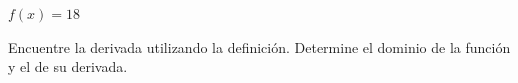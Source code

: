 \item $f(x) = 18$
\par
Encuentre la derivada utilizando la definición. Determine el dominio de la función y el de su derivada.
